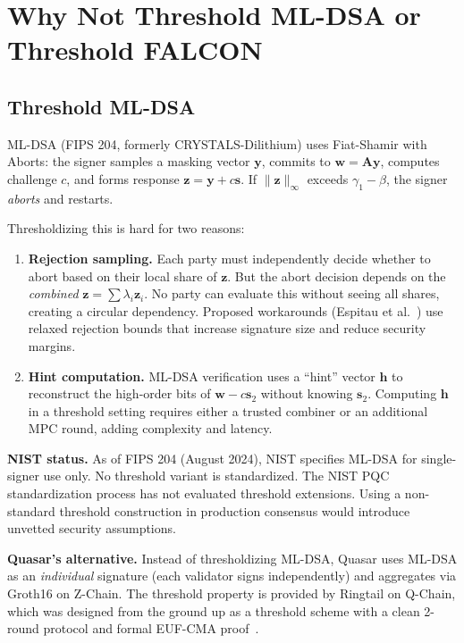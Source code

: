 \section{Why Not Threshold ML-DSA or Threshold FALCON}

\label{app:no-threshold-mldsa}

\subsection{Threshold ML-DSA}

ML-DSA (FIPS 204, formerly CRYSTALS-Dilithium) uses Fiat-Shamir with
Aborts: the signer samples a masking vector $\mathbf{y}$, commits to
$\mathbf{w} = \mathbf{A}\mathbf{y}$, computes challenge $c$, and forms
response $\mathbf{z} = \mathbf{y} + c\mathbf{s}$.  If
$\|\mathbf{z}\|_\infty$ exceeds $\gamma_1 - \beta$, the signer
\emph{aborts} and restarts.

Thresholdizing this is hard for two reasons:

\begin{enumerate}[nosep]
  \item \textbf{Rejection sampling.}  Each party must independently
    decide whether to abort based on their local share of $\mathbf{z}$.
    But the abort decision depends on the \emph{combined}
    $\mathbf{z} = \sum \lambda_i \mathbf{z}_i$.  No party can evaluate
    this without seeing all shares, creating a circular dependency.
    Proposed workarounds (Espitau et al.~\cite{espitau2024}) use
    relaxed rejection bounds that increase signature size and reduce
    security margins.

  \item \textbf{Hint computation.}  ML-DSA verification uses a ``hint''
    vector $\mathbf{h}$ to reconstruct the high-order bits of
    $\mathbf{w} - c\mathbf{s}_2$ without knowing $\mathbf{s}_2$.
    Computing $\mathbf{h}$ in a threshold setting requires either a
    trusted combiner or an additional MPC round, adding complexity and
    latency.
\end{enumerate}

\textbf{NIST status.}  As of FIPS 204 (August 2024), NIST specifies
ML-DSA for single-signer use only.  No threshold variant is
standardized.  The NIST PQC standardization process has not evaluated
threshold extensions.  Using a non-standard threshold construction in
production consensus would introduce unvetted security assumptions.

\textbf{Quasar's alternative.}  Instead of thresholdizing ML-DSA,
Quasar uses ML-DSA as an \emph{individual} signature (each validator
signs independently) and aggregates via Groth16 on Z-Chain.  The
threshold property is provided by Ringtail on Q-Chain, which was
designed from the ground up as a threshold scheme with a clean 2-round
protocol and formal EUF-CMA proof~\cite{ringtail}.

